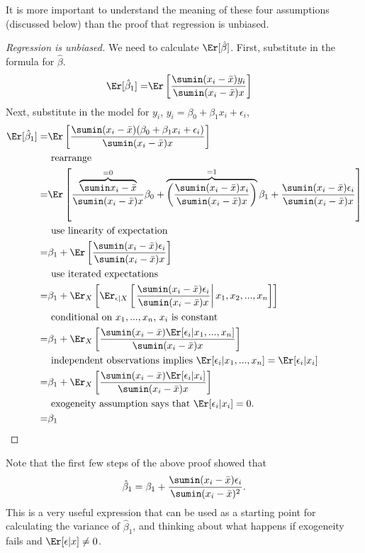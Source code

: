 It is more important to understand the meaning of these four
assumptions (discussed below) than the proof that regression is
unbiased.  
\begin{proof}[Regression is unbiased]
  We need to calculate $\Er[\hat{\beta}]$. First, substitute in the
  formula for $\hat{\beta}$.
  \begin{align*}
    \Er[\hat{\beta}_1] = & \Er\left[ \frac{\sumin (x_i - \bar{x}) y_i
      }{\sumin (x_i - \bar{x})x } \right] 
  \end{align*}
  Next, substitute in the model for $y_i$, $y_i = \beta_0 + \beta_1
  x_i + \epsilon_i$, 
  \begin{align*}
    \Er[\hat{\beta}_1] = & \Er\left[ \frac{\sumin (x_i - \bar{x}) (\beta_0 + \beta_1
  x_i + \epsilon_i)
      }{\sumin (x_i - \bar{x})x } \right] \\
    & \text{ rearrange } \\
    = & \Er\left[ \frac{ \overbrace{\sumin x_i - \bar{x}}^{=0}}{\sumin
        (x_i - \bar{x})x } \beta_0 + \overbrace{\left(\frac{\sumin (x_i - \bar{x})
            x_i}{\sumin (x_i - \bar{x})x }\right)}^{=1} \beta_1 +
      \frac{\sumin (x_i - \bar{x})\epsilon_i} {\sumin (x_i - \bar{x})x }
    \right] \\
    & \text{ use linearity of expectation } \\ 
    = & \beta_1 + \Er\left[ \frac{\sumin (x_i - \bar{x})\epsilon_i} {\sumin (x_i - \bar{x})x }
    \right] \\
    & \text{ use iterated expectations } \\
    = & \beta_1 + \Er_X\left[ \Er_{\epsilon|X}\left[\left. \frac{\sumin (x_i -
            \bar{x})\epsilon_i} {\sumin (x_i - \bar{x})x} \right\vert x_1,
        x_2, ..., x_n \right]\right] \\
    & \text{ conditional on $x_1, ..., x_n$, $x_i$ is constant} \\
    = & \beta_1 + \Er_X\left[ \frac{\sumin (x_i -
        \bar{x})\Er[\epsilon_i|x_1, ..., x_n]} {\sumin (x_i -
        \bar{x})x} \right] \\
    & \text{ independent observations implies $\Er[\epsilon_i|x_1, ...,
      x_n] = \Er[\epsilon_i | x_i]$ } \\
    = & \beta_1 + \Er_X\left[ \frac{\sumin (x_i -
        \bar{x})\Er[\epsilon_i|x_i]} {\sumin (x_i - \bar{x})x} \right] \\
    & \text{ exogeneity assumption says that $\Er[\epsilon_i | x_i] =
      0$.} \\ 
    = & \beta_1
  \end{align*}
\end{proof}
Note that the first few steps of the above proof showed that 
\begin{align*}
  \hat{\beta}_1 = \beta_1 + \frac{\sumin (x_i - \bar{x})
    \epsilon_i}{\sumin (x_i - \bar{x})^2}. 
\end{align*}
This is a very useful expression that can be used as a starting point
for calculating the variance of $\hat{\beta}_1$, and thinking about
what happens if exogeneity fails and $\Er[\epsilon|x] \neq 0$.

